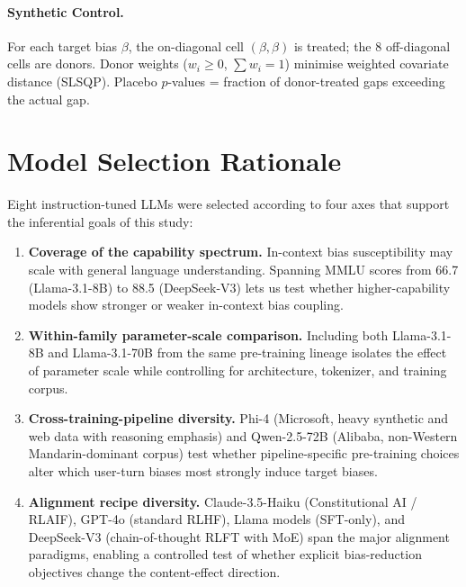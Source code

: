 \documentclass[11pt]{article}
\begin{document}
\paragraph{Synthetic Control.}
For each target bias $\beta$, the on-diagonal cell $(\beta,\beta)$ is treated; the 8 off-diagonal cells are donors. Donor weights ($w_i \geq 0$, $\sum w_i=1$) minimise weighted covariate distance (SLSQP). Placebo $p$-values = fraction of donor-treated gaps exceeding the actual gap.

\section{Model Selection Rationale}
\label{app:model_selection}

Eight instruction-tuned LLMs were selected according to four axes that support the inferential goals of this study:

\begin{enumerate}[leftmargin=*, topsep=2pt, itemsep=2pt]
\item \textbf{Coverage of the capability spectrum.} In-context bias susceptibility may scale with general language understanding. Spanning MMLU scores from 66.7 (Llama-3.1-8B) to 88.5 (DeepSeek-V3) lets us test whether higher-capability models show stronger or weaker in-context bias coupling.

\item \textbf{Within-family parameter-scale comparison.} Including both Llama-3.1-8B and Llama-3.1-70B from the same pre-training lineage isolates the effect of parameter scale while controlling for architecture, tokenizer, and training corpus.

\item \textbf{Cross-training-pipeline diversity.} Phi-4 (Microsoft, heavy synthetic and web data with reasoning emphasis) and Qwen-2.5-72B (Alibaba, non-Western Mandarin-dominant corpus) test whether pipeline-specific pre-training choices alter which user-turn biases most strongly induce target biases.

\item \textbf{Alignment recipe diversity.} Claude-3.5-Haiku (Constitutional AI / RLAIF), GPT-4o (standard RLHF), Llama models (SFT-only), and DeepSeek-V3 (chain-of-thought RLFT with MoE) span the major alignment paradigms, enabling a controlled test of whether explicit bias-reduction objectives change the content-effect direction.
\end{enumerate}
\end{document}
